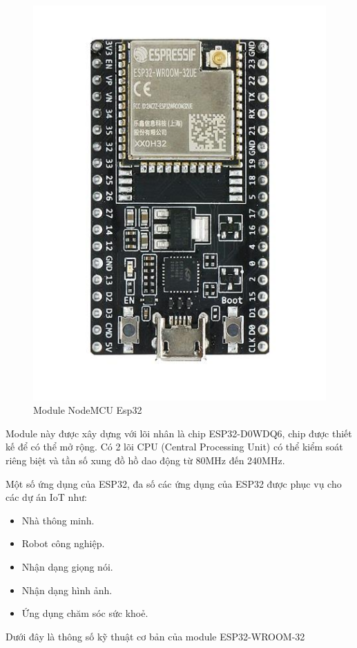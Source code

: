 \documentclass[../DoAn.tex]{subfiles}
\begin{document}
\begin{figure}[H]
    \includegraphics[scale = 0.6]{Hinhve/ESP32.jpg}
    \centering
    \caption{Module NodeMCU Esp32}
\end{figure}

Module này được xây dựng với lõi nhân là chip ESP32-D0WDQ6, chip được thiết kế để có thể mở rộng. Có 2 lõi CPU (Central Processing Unit) có thể kiểm soát riêng biệt và tần số xung đồ hồ dao động từ 80MHz đến 240MHz.

Một số ứng dụng của ESP32, đa số các ứng dụng của ESP32 được phục vụ cho các dự án IoT như:
\begin{itemize}
    \item Nhà thông minh.
    \item Robot công nghiệp.
    \item Nhận dạng giọng nói.
    \item Nhận dạng hình ảnh.
    \item Ứng dụng chăm sóc sức khoẻ.
\end{itemize}

Dưới đây là thông số kỹ thuật cơ bản của module ESP32-WROOM-32
\end{document}
